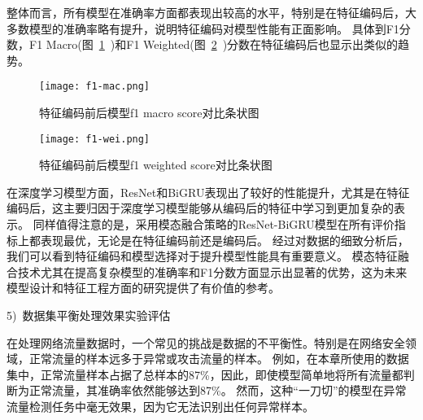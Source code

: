 整体而言，所有模型在准确率方面都表现出较高的水平，特别是在特征编码后，大多数模型的准确率略有提升，说明特征编码对模型性能有正面影响。
具体到F1分数，F1 Macro(图~\ref{fig:f1_macro_score}~)和F1 Weighted(图~\ref{fig:f1_weighted_score}~)分数在特征编码后也显示出类似的趋势。
\begin{figure}[htbp]
	\centering
	\texttt{[image: f1-mac.png]}
	\caption{特征编码前后模型f1 macro score对比条状图}
	\label{fig:f1_macro_score}
\end{figure}
\begin{figure}[htbp]
	\centering
	\texttt{[image: f1-wei.png]}
	\caption{特征编码前后模型f1 weighted score对比条状图}
	\label{fig:f1_weighted_score}
\end{figure}
在深度学习模型方面，ResNet和BiGRU表现出了较好的性能提升，尤其是在特征编码后，这主要归因于深度学习模型能够从编码后的特征中学习到更加复杂的表示。
同样值得注意的是，采用模态融合策略的ResNet-BiGRU模型在所有评价指标上都表现最优，无论是在特征编码前还是编码后。
经过对数据的细致分析后，我们可以看到特征编码和模型选择对于提升模型性能具有重要意义。
模态特征融合技术尤其在提高复杂模型的准确率和F1分数方面显示出显著的优势，这为未来模型设计和特征工程方面的研究提供了有价值的参考。\par

5)~数据集平衡处理效果实验评估\par
在处理网络流量数据时，一个常见的挑战是数据的不平衡性。特别是在网络安全领域，正常流量的样本远多于异常或攻击流量的样本。
例如，在本章所使用的数据集中，正常流量样本占据了总样本的87\%，因此，即使模型简单地将所有流量都判断为正常流量，其准确率依然能够达到87\%。
然而，这种“一刀切”的模型在异常流量检测任务中毫无效果，因为它无法识别出任何异常样本。\par

